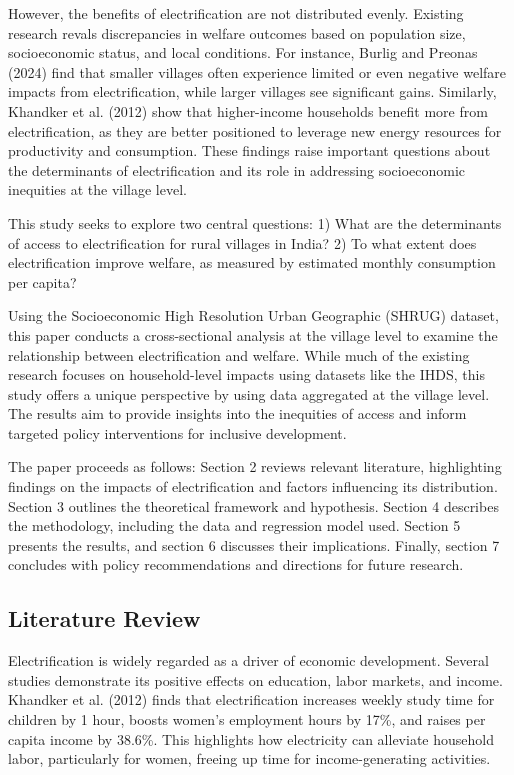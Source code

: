 \documentclass[
]{article}
\begin{document}
However, the benefits of electrification are not distributed evenly.
Existing research revals discrepancies in welfare outcomes based on
population size, socioeconomic status, and local conditions. For
instance, Burlig and Preonas (2024) find that smaller villages often
experience limited or even negative welfare impacts from
electrification, while larger villages see significant gains. Similarly,
Khandker et al. (2012) show that higher-income households benefit more
from electrification, as they are better positioned to leverage new
energy resources for productivity and consumption. These findings raise
important questions about the determinants of electrification and its
role in addressing socioeconomic inequities at the village level.

This study seeks to explore two central questions: 1) What are the
determinants of access to electrification for rural villages in India?
2) To what extent does electrification improve welfare, as measured by
estimated monthly consumption per capita?

Using the Socioeconomic High Resolution Urban Geographic (SHRUG)
dataset, this paper conducts a cross-sectional analysis at the village
level to examine the relationship between electrification and welfare.
While much of the existing research focuses on household-level impacts
using datasets like the IHDS, this study offers a unique perspective by
using data aggregated at the village level. The results aim to provide
insights into the inequities of access and inform targeted policy
interventions for inclusive development.

The paper proceeds as follows: Section 2 reviews relevant literature,
highlighting findings on the impacts of electrification and factors
influencing its distribution. Section 3 outlines the theoretical
framework and hypothesis. Section 4 describes the methodology, including
the data and regression model used. Section 5 presents the results, and
section 6 discusses their implications. Finally, section 7 concludes
with policy recommendations and directions for future research.

\hypertarget{literature-review}{%
\subsection{Literature Review}\label{literature-review}}

Electrification is widely regarded as a driver of economic development.
Several studies demonstrate its positive effects on education, labor
markets, and income. Khandker et al. (2012) finds that electrification
increases weekly study time for children by 1 hour, boosts women's
employment hours by 17\%, and raises per capita income by 38.6\%. This
highlights how electricity can alleviate household labor, particularly
for women, freeing up time for income-generating activities.
\end{document}
